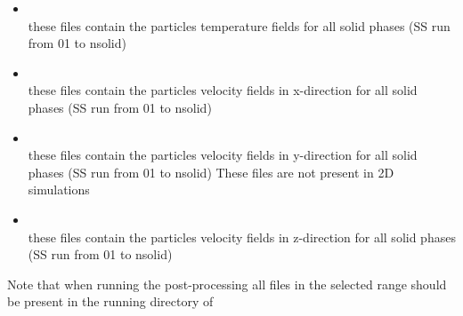 \begin{itemize}
\item {} \\
      these files contain the particles temperature fields
      for all solid phases (SS run from 01 to nsolid)

\item {} \\
      these files contain the particles velocity fields in x-direction
      for all solid phases (SS run from 01 to nsolid)

\item {} \\
      these files contain the particles velocity fields in y-direction
      for all solid phases (SS run from 01 to nsolid)
      These files are not present in 2D simulations

\item {} \\
      these files contain the particles velocity fields in z-direction
      for all solid phases (SS run from 01 to nsolid)


\end{itemize}

Note that when running the post-processing all 
 files in the selected range should 
be present in the running directory of 

%
%
%
%
